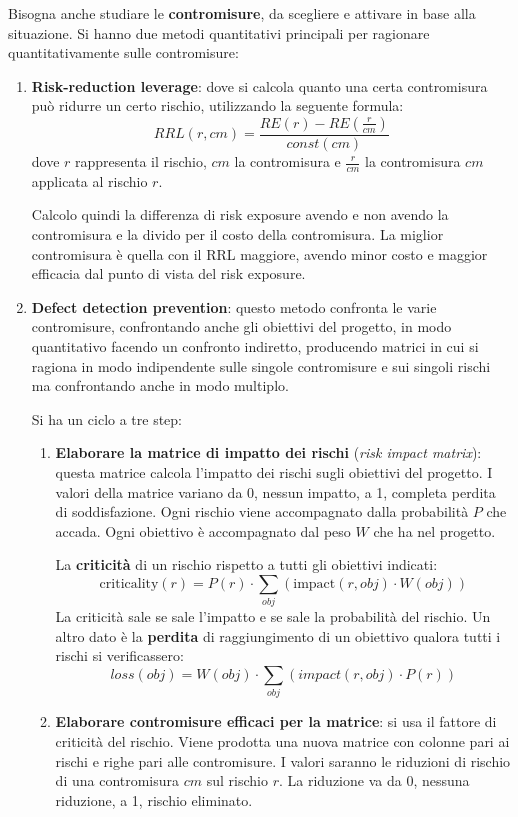 Bisogna anche studiare le \textbf{contromisure}, da scegliere e attivare in base alla situazione. Si hanno due metodi quantitativi principali per ragionare quantitativamente sulle contromisure:
\begin{enumerate}
    \item \textbf{Risk-reduction leverage}: dove si calcola quanto una certa contromisura può ridurre un certo rischio, utilizzando la seguente formula: 
    \begin{equation}
        RRL(r, cm) = \frac{RE(r) - RE(\frac{r}{cm})}{const(cm)}
    \end{equation}
    dove $r$ rappresenta il rischio, $cm$ la contromisura e $\frac{r}{cm}$ la contromisura $cm$ applicata al rischio $r$.
    
    Calcolo quindi la differenza di risk exposure avendo e non avendo la contromisura e la divido per il costo della contromisura. La miglior contromisura è quella con il RRL maggiore, avendo minor costo e maggior efficacia dal punto di vista del risk exposure.
    \item \textbf{Defect detection prevention}: questo metodo confronta le varie contromisure, confrontando anche gli obiettivi del progetto, in modo quantitativo facendo un confronto indiretto, producendo matrici in cui si ragiona in modo indipendente sulle singole contromisure e sui singoli rischi ma confrontando anche in modo multiplo.

    Si ha un ciclo a tre step:
    \begin{enumerate}
        \item \textbf{Elaborare la matrice di impatto dei rischi} (\textit{risk impact matrix}): questa matrice calcola l'impatto dei rischi sugli obiettivi del progetto. I valori della matrice variano da 0, nessun impatto, a 1, completa perdita di soddisfazione. Ogni rischio viene accompagnato dalla probabilità $P$ che accada. Ogni obiettivo è accompagnato dal peso $W$ che ha nel progetto. 
        
        La \textbf{criticità} di un rischio rispetto a tutti gli obiettivi indicati:
        \begin{equation}
            \text{criticality}(r) = P(r) \cdot \sum_{obj} (\text{impact}(r, obj) \cdot W(obj))
        \end{equation}
        La criticità sale se sale l'impatto e se sale la probabilità del rischio. Un altro dato è la \textbf{perdita} di raggiungimento di un obiettivo qualora tutti i rischi si verificassero:
        \begin{equation}
            loss(obj) = W(obj) \cdot \sum_{obj} (impact(r, obj) \cdot P(r))
        \end{equation}
        \item \textbf{Elaborare contromisure efficaci per la matrice}: si usa il fattore di criticità del rischio. Viene prodotta una nuova matrice con colonne pari ai rischi e righe pari alle contromisure. I valori saranno le riduzioni di rischio di una contromisura $cm$ sul rischio $r$. La riduzione va da 0, nessuna riduzione, a 1, rischio eliminato.
        

\end{enumerate}
\end{enumerate}
